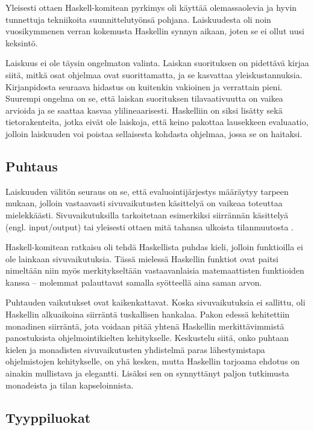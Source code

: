 \documentclass[finnish]{tktltiki2}
\begin{document}
Yleisesti ottaen Haskell-komitean pyrkimys oli käyttää olemassaolevia ja hyvin tunnettuja
tekniikoita suunnittelutyönsä pohjana. Laiskuudesta oli noin vuosikymmenen verran kokemusta
Haskellin synnyn aikaan, joten se ei ollut uusi keksintö.

Laiskuus ei ole täysin ongelmaton valinta. Laiskan suorituksen on pidettävä kirjaa siitä, mitkä osat
ohjelmaa ovat suorittamatta, ja se kasvattaa yleiskustannuksia. Kirjanpidosta seuraava hidastus on
kuitenkin vakioinen ja verrattain pieni. Suurempi ongelma on se, että laiskan suorituksen
tilavaativuutta on vaikea arvioida ja se saattaa kasvaa ylilineaarisesti. Haskelliin on siksi
lisätty sekä tietorakenteita, jotka eivät ole laiskoja, että keino pakottaa lausekkeen evaluaatio,
jolloin laiskuuden voi poistaa sellaisesta kohdasta ohjelmaa, jossa se on haitaksi.

\subsection{Puhtaus}

Laiskuuden välitön seuraus on se, että evaluointijärjestys määräytyy tarpeen mukaan, jolloin
vastaavasti sivuvaikutusten käsittelyä on vaikeaa toteuttaa mielekkäästi. Sivuvaikutuksilla
tarkoitetaan esimerkiksi siirrännän käsittelyä (engl. input/output) tai yleisesti ottaen mitä
tahansa ulkoista tilanmuutosta .

Haskell-komitean ratkaisu oli tehdä Haskellista puhdas kieli, jolloin funktioilla ei ole lainkaan
sivuvaikutuksia. Tässä mielessä Haskellin funktiot ovat paitsi nimeltään niin myös merkitykseltään
vastaavanlaisia matemaattisten funktioiden kanssa -- molemmat palauttavat samalla syötteellä aina
saman arvon.

Puhtauden vaikutukset ovat kaikenkattavat. Koska sivuvaikutuksia ei sallittu, oli Haskellin
alkuaikoina siirräntä tuskallisen hankalaa. Pakon edessä kehitettiin monadinen siirräntä, jota
voidaan pitää yhtenä Haskellin merkittävimmistä panostuksista ohjelmointikielten kehitykselle.
Keskustelu siitä, onko puhtaan kielen ja monadisten sivuvaikutusten yhdistelmä paras lähestymistapa
ohjelmistojen kehitykselle, on yhä kesken, mutta Haskellin tarjoama ehdotus on ainakin mullistava ja
elegantti. Lisäksi sen on synnyttänyt paljon tutkimusta monadeista ja tilan kapseloinnista.

\subsection{Tyyppiluokat}
\end{document}

